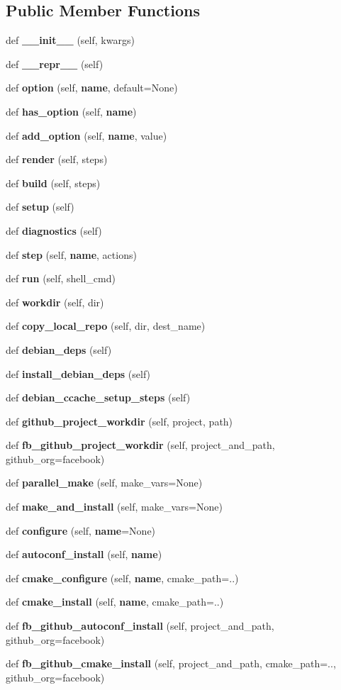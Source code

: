 \subsection*{Public Member Functions}
\begin{DoxyCompactItemize}
\item 
def {\bf \+\_\+\+\_\+init\+\_\+\+\_\+} (self, kwargs)
\item 
def {\bf \+\_\+\+\_\+repr\+\_\+\+\_\+} (self)
\item 
def {\bf option} (self, {\bf name}, default=None)
\item 
def {\bf has\+\_\+option} (self, {\bf name})
\item 
def {\bf add\+\_\+option} (self, {\bf name}, value)
\item 
def {\bf render} (self, steps)
\item 
def {\bf build} (self, steps)
\item 
def {\bf setup} (self)
\item 
def {\bf diagnostics} (self)
\item 
def {\bf step} (self, {\bf name}, actions)
\item 
def {\bf run} (self, shell\+\_\+cmd)
\item 
def {\bf workdir} (self, dir)
\item 
def {\bf copy\+\_\+local\+\_\+repo} (self, dir, dest\+\_\+name)
\item 
def {\bf debian\+\_\+deps} (self)
\item 
def {\bf install\+\_\+debian\+\_\+deps} (self)
\item 
def {\bf debian\+\_\+ccache\+\_\+setup\+\_\+steps} (self)
\item 
def {\bf github\+\_\+project\+\_\+workdir} (self, project, path)
\item 
def {\bf fb\+\_\+github\+\_\+project\+\_\+workdir} (self, project\+\_\+and\+\_\+path, github\+\_\+org=\textquotesingle{}facebook\textquotesingle{})
\item 
def {\bf parallel\+\_\+make} (self, make\+\_\+vars=None)
\item 
def {\bf make\+\_\+and\+\_\+install} (self, make\+\_\+vars=None)
\item 
def {\bf configure} (self, {\bf name}=None)
\item 
def {\bf autoconf\+\_\+install} (self, {\bf name})
\item 
def {\bf cmake\+\_\+configure} (self, {\bf name}, cmake\+\_\+path=\textquotesingle{}..\textquotesingle{})
\item 
def {\bf cmake\+\_\+install} (self, {\bf name}, cmake\+\_\+path=\textquotesingle{}..\textquotesingle{})
\item 
def {\bf fb\+\_\+github\+\_\+autoconf\+\_\+install} (self, project\+\_\+and\+\_\+path, github\+\_\+org=\textquotesingle{}facebook\textquotesingle{})
\item 
def {\bf fb\+\_\+github\+\_\+cmake\+\_\+install} (self, project\+\_\+and\+\_\+path, cmake\+\_\+path=\textquotesingle{}..\textquotesingle{}, github\+\_\+org=\textquotesingle{}facebook\textquotesingle{})
\end{DoxyCompactItemize}
